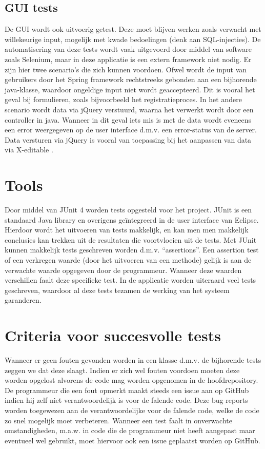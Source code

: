 \subsection{GUI tests}
De GUI wordt ook uitvoerig getest.
Deze moet blijven werken zoals verwacht met willekeurige input, mogelijk met kwade bedoelingen (denk aan SQL-injecties). 
De automatisering van deze tests wordt vaak uitgevoerd door middel van software zoals Selenium, maar in deze applicatie is een extern framework niet nodig.
Er zijn hier twee scenario's die zich kunnen voordoen.
Ofwel wordt de input van gebruikers door het Spring framework rechtstreeks gebonden aan een bijhorende java-klasse, waardoor ongeldige input niet wordt geaccepteerd.
Dit is vooral het geval bij formulieren, zoals bijvoorbeeld het registratieproces.
In het andere scenario wordt data via jQuery verstuurd, waarna het verwerkt wordt door een controller in java.
Wanneer in dit geval iets mis is met de data wordt eveneens een error weergegeven op de user interface d.m.v. een error-status van de server. 
Data versturen via jQuery is vooral van toepassing bij het aanpassen van data via X-editable \cite{xeditable}.


\section{Tools}
Door middel van JUnit 4\cite{junit} worden tests opgesteld voor het project. 
JUnit is een standaard Java library en overigens geïntegreerd in de user interface van Eclipse.
Hierdoor wordt het uitvoeren van tests makkelijk, en kan men men makkelijk conclusies kan trekken uit de resultaten die voortvloeien uit de tests.
Met JUnit kunnen makkelijk tests geschreven worden d.m.v. ``assertions''. 
Een assertion test of een verkregen waarde (door het uitvoeren van een methode) gelijk is aan de verwachte waarde opgegeven door de programmeur. 
Wanneer deze waarden verschillen faalt deze specifieke test.
In de applicatie worden uiteraard veel tests geschreven, waardoor al deze tests tezamen de werking van het systeem garanderen. 

\section{Criteria voor succesvolle tests}
Wanneer er geen fouten gevonden worden in een klasse d.m.v. de bijhorende tests zeggen we dat deze slaagt. 
Indien er zich wel fouten voordoen moeten deze worden opgelost alvorens de code mag worden opgenomen in de hoofdrepository.
De programmeur die een fout opmerkt maakt steeds een issue aan op GitHub indien hij zelf niet verantwoordelijk is voor de falende code.
Deze bug reports worden toegewezen aan de verantwoordelijke voor de falende code, welke de code zo snel mogelijk moet verbeteren. 
Wanneer een test faalt in onverwachte omstandigheden, m.a.w. in code die de programmeur niet heeft aangepast maar eventueel wel gebruikt, moet hiervoor ook een issue geplaatst worden op GitHub.


